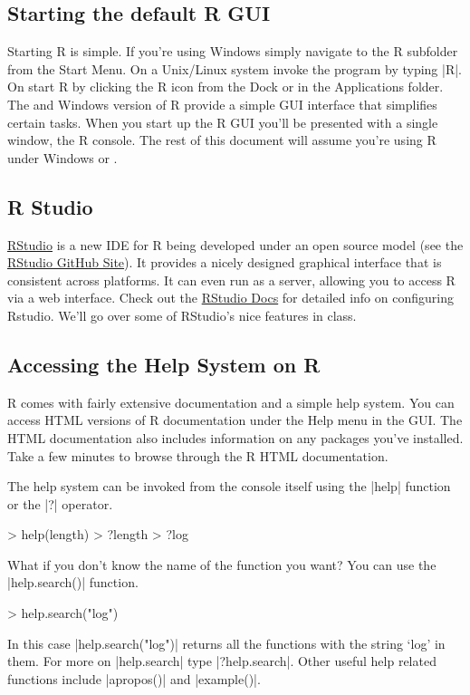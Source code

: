 
\subsection{Starting the default R GUI}

Starting R is simple. If you're using Windows simply navigate to the R
subfolder from the Start Menu. On a Unix/Linux system invoke the program by
typing |R|. On \OSX start R by clicking the R icon from the Dock or in the
Applications folder. The \OSX and Windows version of R provide a simple GUI
interface that simplifies certain tasks. When you start up the R GUI you'll be
presented with a single window, the R console. The rest of this document will
assume you're using R under Windows or \OSX.

\subsection{R Studio}

\href{http://rstudio.org/}{RStudio} is a new IDE for R being developed under
an open source model (see the
\href{https://github.com/rstudio/rstudio}{RStudio GitHub Site}). It provides a
nicely designed graphical interface that is consistent across platforms. It
can even run as a server, allowing you to access R via a web interface. Check
out the \href{http://rstudio.org/docs/}{RStudio Docs} for detailed info on
configuring Rstudio. We'll go over some of RStudio's nice features in class.

\subsection{Accessing the Help System on R}

R comes with fairly extensive documentation and a simple help system. You can
access HTML versions of R documentation under the Help menu in the GUI. The
HTML documentation also includes information on any packages you've installed.
Take a few minutes to browse through the R HTML documentation.

The help system can be invoked from the console itself using the
|help| function or the |?| operator.
%
\begin{R}
> help(length)
> ?length 
> ?log
\end{R}
%
What if you don't know the name of the function you want? You can use
the |help.search()| function.
%
\begin{R}
> help.search("log")
\end{R}
%
In this case |help.search("log")| returns all the functions with
the string `log' in them. For more on |help.search| type
|?help.search|. Other useful help related functions include
|apropos()| and |example()|.

